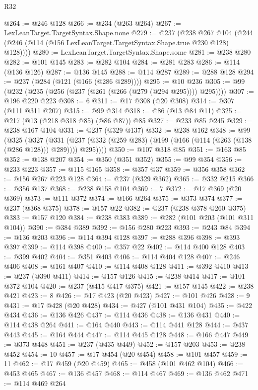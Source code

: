 \begin{lexlean}{R32}
\begin{coremodule}
@264 := @246 @128
@266 := @234 (@263 @264)
@267 := LexLeanTarget.TargetSyntax.Shape.none
@279 := @237
    (@238
      @267
      @104
      (@244 (@246 (@114 (@156 LexLeanTarget.TargetSyntax.Shape.true @230 @128) @128))))
@280 := LexLeanTarget.TargetSyntax.Shape.some
@281 := @238 @280
@282 := @101 @145
@283 := @282 @104
@284 := @281 @283
@286 := @114 (@136 @126)
@287 := @136 @145
@288 := @114 @287
@289 := @288 @128
@294 := @237 (@284 (@121 (@166 (@286 @289))))
@295 := @10 @236
@305 := @99 (@232 (@235 (@256 (@237 (@261 (@266 (@279 (@294 @295)))) @295))))
@307 := @196 @220 @223
@308 := 6
@311 := @17 @308 (@20 @308)
@314 := @307 (@111 @311 @207)
@315 := @99 @314
@318 := @86 (@13 @84 @11)
@325 := @217 (@13 (@218 @318 @85) (@86 @87)) @85
@327 := @233 @85 @245
@329 := @238 @167 @104
@331 := @237 (@329 @137)
@332 := @238 @162
@348 := @99
    (@325
      (@327
        (@331 (@237 (@332 (@259 @283) (@199 (@166 (@114 (@263 (@138 (@286 @128))) @289)))) @295))))
@350 := @107 @318 @85
@351 := @163 @85
@352 := @138 @207
@354 := @350 (@351 @352)
@355 := @99 @354
@356 := @233 @223
@357 := @115 @165
@358 := @357 @37
@359 := @356 @358
@362 := @156 @267 @223 @128
@364 := @237 (@329 @362)
@365 := @332 @215
@366 := @356 @137
@368 := @238 @158 @104
@369 := 7
@372 := @17 @369 (@20 @369)
@373 := @111 @372
@374 := @166 @264
@375 := @373 @374
@377 := @237 (@368 @375)
@378 := @157 @22
@382 := @237 (@238 @378 @260 @375)
@383 := @157 @120
@384 := @238 @383
@389 := @282 (@101 @203 (@101 @311 @104))
@390 := @384 @389
@392 := @156 @280 @223
@393 := @243 @84
@394 := @136 @203
@396 := @114 @394 @128
@397 := @288 @396
@398 := @393 @397
@399 := @114 @398
@400 := @357 @22
@402 := @114 @400 @128
@403 := @399 @402
@404 := @351 @403
@406 := @114 @404 @128
@407 := @246 @406
@408 := @161 @407
@410 := @114 @408 @128
@411 := @392 @410
@413 := @237 (@390 @411)
@414 := @157 @126
@415 := @238 @414
@417 := @101 @372 @104
@420 := @237 (@415 @417 @375)
@421 := @157 @145
@422 := @238 @421
@423 := 8
@426 := @17 @423 (@20 @423)
@427 := @101 @426
@428 := 9
@431 := @17 @428 (@20 @428)
@434 := @427 (@101 @431 @104)
@435 := @422 @434
@436 := @136 @426
@437 := @114 @436
@438 := @136 @431
@440 := @114 @438 @264
@441 := @164 @440
@443 := @114 @441 @128
@444 := @437 @443
@445 := @164 @444
@447 := @114 @445 @128
@448 := @166 @447
@449 := @373 @448
@451 := @237 (@435 @449)
@452 := @157 @203
@453 := @238 @452
@454 := 10
@457 := @17 @454 (@20 @454)
@458 := @101 @457
@459 := 11
@462 := @17 @459 (@20 @459)
@465 := @458 (@101 @462 @104)
@466 := @453 @465
@467 := @136 @457
@468 := @114 @467
@469 := @136 @462
@471 := @114 @469 @264

\end{coremodule}
\end{lexlean}
